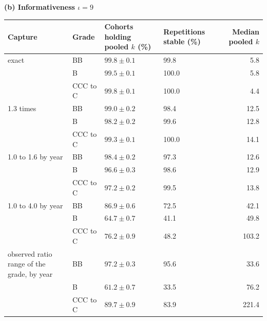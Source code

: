 \begin{table}[htbp]
\textbf{(b) Informativeness $\iota=9$}\par\smallskip
\begin{tabular}{p{4.2cm}lp{2.4cm}p{2.0cm}r}
\toprule
Capture & Grade & Cohorts holding pooled $k$ (\%) & Repetitions stable (\%) & Median pooled $k$ \\
\midrule
exact & BB & $99.8\pm0.1$ & 99.8 & 5.8 \\
 & B & $99.5\pm0.1$ & 100.0 & 5.8 \\
 & CCC to C & $99.8\pm0.1$ & 100.0 & 4.4 \\
1.3 times & BB & $99.0\pm0.2$ & 98.4 & 12.5 \\
 & B & $98.2\pm0.2$ & 99.6 & 12.8 \\
 & CCC to C & $99.3\pm0.1$ & 100.0 & 14.1 \\
1.0 to 1.6 by year & BB & $98.4\pm0.2$ & 97.3 & 12.6 \\
 & B & $96.6\pm0.3$ & 98.6 & 12.9 \\
 & CCC to C & $97.2\pm0.2$ & 99.5 & 13.8 \\
1.0 to 4.0 by year & BB & $86.9\pm0.6$ & 72.5 & 42.1 \\
 & B & $64.7\pm0.7$ & 41.1 & 49.8 \\
 & CCC to C & $76.2\pm0.9$ & 48.2 & 103.2 \\
observed ratio range of the grade, by year & BB & $97.2\pm0.3$ & 95.6 & 33.6 \\
 & B & $61.2\pm0.7$ & 33.5 & 76.2 \\
 & CCC to C & $89.7\pm0.9$ & 83.9 & 221.4 \\
\bottomrule
\end{tabular}
\end{table}
